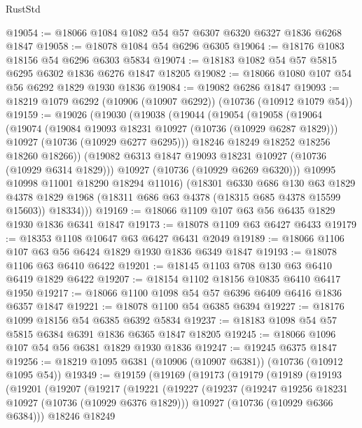 \begin{lexlean}{RustStd}
\begin{coremodule}
@19054 := @18066 @1084 @1082 @54 @57 @6307 @6320 @6327 @1836 @6268 @1847
@19058 := @18078 @1084 @54 @6296 @6305
@19064 := @18176 @1083 @18156 @54 @6296 @6303 @5834
@19074 := @18183 @1082 @54 @57 @5815 @6295 @6302 @1836 @6276 @1847 @18205
@19082 := @18066 @1080 @107 @54 @56 @6292 @1829 @1930 @1836
@19084 := @19082 @6286 @1847
@19093 := @18219 @1079 @6292 (@10906 (@10907 @6292)) (@10736 (@10912 @1079 @54))
@19159 := @19026
    (@19030
      (@19038
        (@19044
          (@19054
            (@19058
              (@19064
                (@19074
                  (@19084 @19093 @18231 @10927 (@10736 (@10929 @6287 @1829)))
                  @10927
                  (@10736 (@10929 @6277 @6295)))
                @18246
                @18249
                @18252
                @18256
                @18260
                @18266))
            (@19082 @6313 @1847 @19093 @18231 @10927 (@10736 (@10929 @6314 @1829)))
            @10927
            (@10736 (@10929 @6269 @6320)))
          @10995
          @10998
          @11001
          @18290
          @18294
          @11016)
        (@18301
          @6330
          @686
          @130
          @63
          @1829
          @4378
          @1829
          @1968
          (@18311 @686 @63 @4378 (@18315 @685 @4378 @15599 @15603))
          @18334)))
@19169 := @18066 @1109 @107 @63 @56 @6435 @1829 @1930 @1836 @6341 @1847
@19173 := @18078 @1109 @63 @6427 @6433
@19179 := @18353 @1108 @10647 @63 @6427 @6431 @2049
@19189 := @18066 @1106 @107 @63 @56 @6424 @1829 @1930 @1836 @6349 @1847
@19193 := @18078 @1106 @63 @6410 @6422
@19201 := @18145 @1103 @708 @130 @63 @6410 @6419 @1829 @6422
@19207 := @18154 @1102 @18156 @10835 @6410 @6417 @1950
@19217 := @18066 @1100 @1098 @54 @57 @6396 @6409 @6416 @1836 @6357 @1847
@19221 := @18078 @1100 @54 @6385 @6394
@19227 := @18176 @1099 @18156 @54 @6385 @6392 @5834
@19237 := @18183 @1098 @54 @57 @5815 @6384 @6391 @1836 @6365 @1847 @18205
@19245 := @18066 @1096 @107 @54 @56 @6381 @1829 @1930 @1836
@19247 := @19245 @6375 @1847
@19256 := @18219 @1095 @6381 (@10906 (@10907 @6381)) (@10736 (@10912 @1095 @54))
@19349 := @19159
    (@19169
      (@19173
        (@19179
          (@19189
            (@19193
              (@19201
                (@19207
                  (@19217
                    (@19221
                      (@19227
                        (@19237
                          (@19247 @19256 @18231 @10927 (@10736 (@10929 @6376 @1829)))
                          @10927
                          (@10736 (@10929 @6366 @6384)))
                        @18246
                        @18249

\end{coremodule}
\end{lexlean}
